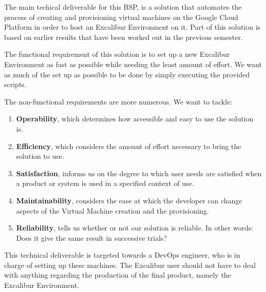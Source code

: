 The main techical deliverable for this BSP, is a solution that
automates the process of creating and provisioning virtual machines on
the Google Cloud Platform in order to host an Excalibur Environment on
it. Part of this solution is based on earlier results that have been
worked out in the previous semester. 

The functional requirement of this solution is to set up a new
Excalibur Environment as fast as possible while needing the least
amount of effort. We want as much of the set up as possible to be done
by simply executing the provided scripts.

The non-functional requirements are more numerous. We want to tackle:
\begin{enumerate}

	\item \textbf{Operability}, which determines how accessible and
		easy to use the solution is.

	\item \textbf{Efficiency}, which considers the amount of effort
		necessary to bring the solution to use.
		
	\item \textbf{Satisfaction}, informs us on the degree to which user needs
		are satisfied when a product or system is used in a specified
		context of use.
		
	
	\item \textbf{Maintainability}, considers the ease at which the developer
		can change aspects of the Virtual Machine creation and the provisioning.
		
	\item \textbf{Reliability}, tells us whether or not our solution
		is reliable. In other words: Does it give the same result in
		successive trials?
		
\end{enumerate}

This technical deliverable is targeted towards a DevOps engineer, who
is in charge of setting up these machines. The Excalibur user should
not have to deal with anything regarding the production of the final
product, namely the Excalibur Environment.
